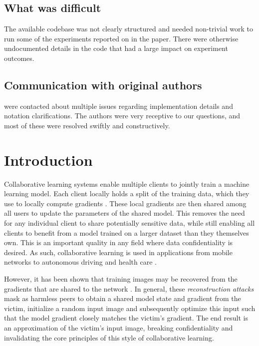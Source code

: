 \subsection{What was difficult}

The available codebase was not clearly structured and needed non-trivial work to run some of the experiments reported on in the paper. There were otherwise undocumented details in the code that had a large impact on experiment outcomes.

\subsection*{Communication with original authors}

\citet{gao2021privacy} were contacted about multiple issues regarding implementation details and notation clarifications. The authors were very receptive to our questions, and most of these were resolved swiftly and constructively.

\newpage


\section{Introduction}
\label{sec:intro}

Collaborative learning systems enable multiple clients to jointly train a machine learning model. Each client locally holds a split of the training data, which they use to locally compute gradients \cite{yang2019federated}\cite{guo2020towards}\cite{melis2019exploiting}. These local gradients are then shared among all users to update the parameters of the shared model. This removes the need for any individual client to share potentially sensitive data, while still enabling all clients to benefit from a model trained on a larger dataset than they themselves own. This is an important quality in any field where data confidentiality is desired. As such, collaborative learning is used in applications from mobile networks \cite{kang2019} to autonomous driving \cite{niknam2020federated} and health care \cite{brisimi2018federated}.

However, it has been shown that training images may be recovered from the gradients that are shared to the network \cite{geiping2020inverting}\cite{zhao2020idlg}\cite{zhu2019}. In general, these \emph{reconstruction attacks} mask as harmless peers to obtain a shared model state and gradient from the victim, initialize a random input image and subsequently optimize this input such that the model gradient closely matches the victim's gradient. The end result is an approximation of the victim's input image, breaking confidentiality and invalidating the core principles of this style of collaborative learning.

